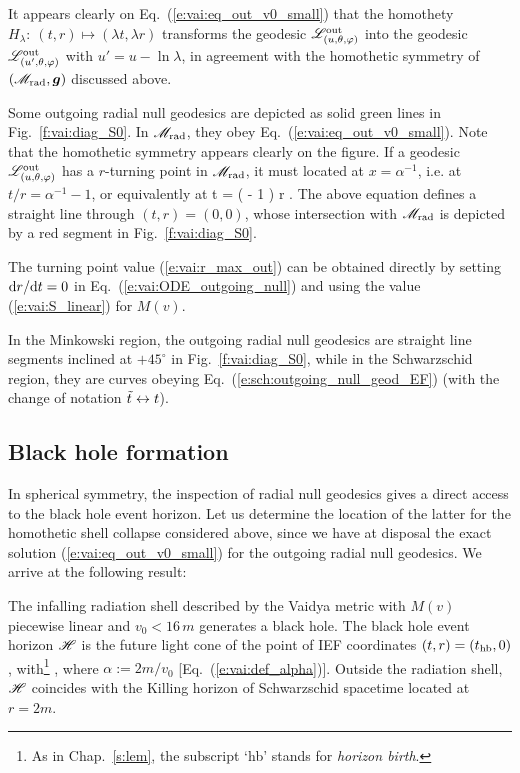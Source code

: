 It appears clearly on Eq.~(\ref{e:vai:eq_out_v0_small}) that
the homothety $H_\lambda:\ (t, r) \mapsto (\lambda t, \lambda r)$
transforms the geodesic $\mathscr{L}_{(u,\theta,\varphi)}^{\rm out}$  into the geodesic
$\mathscr{L}_{(u',\theta,\varphi)}^{\rm out}$ with $u' = u - \ln \lambda$,
in agreement with the homothetic symmetry of $(\mathscr{M}_{\rm rad}, \bm{g})$ discussed
above.

Some outgoing radial null geodesics are depicted as solid green lines
in Fig.~\ref{f:vai:diag_S0}. In $\mathscr{M}_{\rm rad}$, they obey
Eq.~(\ref{e:vai:eq_out_v0_small}).
Note that the homothetic symmetry appears clearly on the figure.
If a geodesic $\mathscr{L}_{(u,\theta,\varphi)}^{\rm out}$  has a $r$-turning point in $\mathscr{M}_{\rm rad}$,
it must located at $x = \alpha^{-1}$, i.e. at $t/r = \alpha^{-1} - 1$,
or equivalently at
\be \label{e:vai:r_max_out}
  t = \left(  - 1 \right) r .
\ee
The above equation defines a straight line through $(t,r) = (0,0)$,
whose intersection with $\mathscr{M}_{\rm rad}$ is depicted by a red segment
in Fig.~\ref{f:vai:diag_S0}.
\begin{remark}
The turning point value (\ref{e:vai:r_max_out}) can be obtained
directly by setting $\mathrm{d} r / \mathrm{d} t = 0$ in Eq.~(\ref{e:vai:ODE_outgoing_null})
and using the value (\ref{e:vai:S_linear}) for $M(v)$.
\end{remark}

In the Minkowski region, the outgoing radial null geodesics are straight line
segments inclined at $+45^\circ$ in Fig.~\ref{f:vai:diag_S0}, while
in the Schwarzschid region, they are curves obeying Eq.~(\ref{e:sch:outgoing_null_geod_EF})
(with the change of notation ${\tilde t} \leftrightarrow t$).


\subsection{Black hole formation} \label{s:vai:BH_formation}

In spherical symmetry, the inspection of radial null geodesics gives
a direct access to the black hole event horizon.
Let us determine the location of the latter for the homothetic
shell collapse considered above, since we have at disposal the exact solution
(\ref{e:vai:eq_out_v0_small}) for the outgoing radial null geodesics.
We arrive at the following result:
\begin{greybox}
The infalling radiation shell described by the Vaidya metric with $M(v)$ piecewise linear
and $v_0 < 16\,  m$ generates a black hole. The black hole event horizon $\mathscr{H}$
is the future light cone of the point of IEF coordinates
$(t, r) = (t_{\rm hb}, 0)$, with\footnote{As in Chap.~\ref{s:lem}, the subscript `hb' stands
for \emph{horizon birth}.}
\be \label{e:vai:t_hb}
     ,
\ee
where $\alpha := 2m/v_0$ [Eq.~(\ref{e:vai:def_alpha})].
Outside the radiation shell, $\mathscr{H}$ coincides with the
Killing horizon of Schwarzschid spacetime located at $r=2m$.
\end{greybox}

